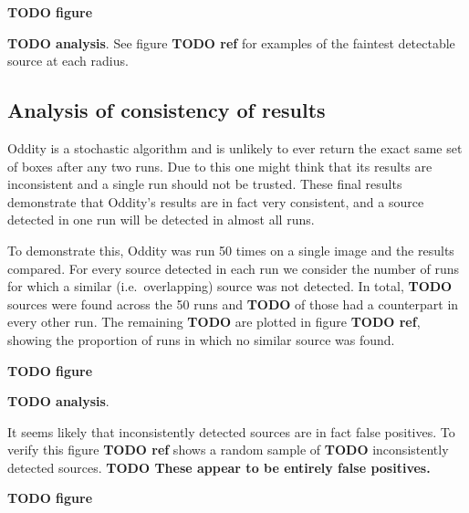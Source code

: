 \documentclass[manuscript]{aastex}
\newcommand{\TODO}[1]{\textbf{TODO #1}}
\begin{document}
\TODO{figure}

\TODO{analysis}. See figure \TODO{ref} for examples of the faintest detectable source at each radius.

\subsection{Analysis of consistency of results}

Oddity is a stochastic algorithm and is unlikely to ever return the exact same set of boxes after any two runs. Due to this one might think that its results are inconsistent and a single run should not be trusted. These final results demonstrate that Oddity's results are in fact very consistent, and a source detected in one run will be detected in almost all runs.

To demonstrate this, Oddity was run 50 times on a single image and the results compared. For every source detected in each run we consider the number of runs for which a similar (i.e.\ overlapping) source was not detected. In total, \TODO{} sources were found across the 50 runs and \TODO{} of those had a counterpart in every other run. The remaining \TODO{} are plotted in figure \TODO{ref}, showing the proportion of runs in which no similar source was found.

\TODO{figure}

\TODO{analysis}.

It seems likely that inconsistently detected sources are in fact false positives. To verify this figure \TODO{ref} shows a random sample of \TODO{} inconsistently detected sources. \TODO{These appear to be entirely false positives.}

\TODO{figure}
\end{document}
